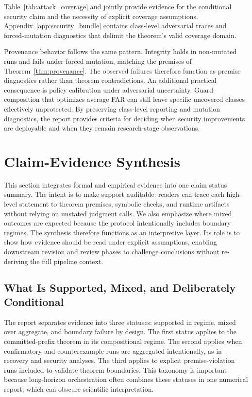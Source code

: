 \documentclass{article} %
\begin{document}
Table~\ref{tab:attack_coverage} and  jointly provide evidence for the conditional security claim and the necessity of explicit coverage assumptions. Appendix~\ref{app:security_bundle} contains class-level adversarial traces and forced-mutation diagnostics that delimit the theorem's valid coverage domain.

Provenance behavior follows the same pattern. Integrity holds in non-mutated runs and fails under forced mutation, matching the premises of Theorem~\ref{thm:provenance}. The observed failures therefore function as premise diagnostics rather than theorem contradictions.
An additional practical consequence is policy calibration under adversarial uncertainty. Guard composition that optimizes average FAR can still leave specific uncovered classes effectively unprotected. By preserving class-level reporting and mutation diagnostics, the report provides criteria for deciding when security improvements are deployable and when they remain research-stage observations.

\section{Claim-Evidence Synthesis}
\label{sec:synthesis}
This section integrates formal and empirical evidence into one claim status summary. The intent is to make support auditable: readers can trace each high-level statement to theorem premises, symbolic checks, and runtime artifacts without relying on unstated judgment calls. We also emphasize where mixed outcomes are expected because the protocol intentionally includes boundary regimes.
The synthesis therefore functions as an interpretive layer. Its role is to show how evidence should be read under explicit assumptions, enabling downstream revision and review phases to challenge conclusions without re-deriving the full pipeline context.

\subsection{What Is Supported, Mixed, and Deliberately Conditional}
The report separates evidence into three statuses: supported in regime, mixed over aggregate, and boundary failure by design. The first status applies to the committed-prefix theorem in its compositional regime. The second applies when confirmatory and counterexample runs are aggregated intentionally, as in recovery and security analyses. The third applies to explicit premise-violation runs included to validate theorem boundaries. This taxonomy is important because long-horizon orchestration often combines these statuses in one numerical report, which can obscure scientific interpretation.
\end{document}
